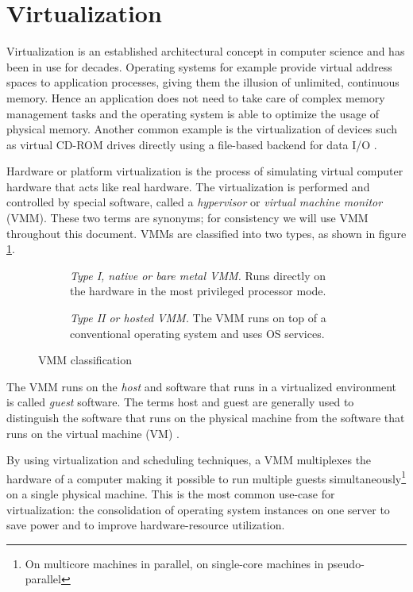 \section{Virtualization}
Virtualization is an established architectural concept in computer science and
has been in use for decades. Operating systems for example provide virtual
address spaces to application processes, giving them the illusion of unlimited,
continuous memory. Hence an application does not need to take care of complex
memory management tasks and the operating system is able to optimize the usage
of physical memory. Another common example is the virtualization of devices such
as virtual CD-ROM drives directly using a file-based backend for data I/O
\cite{CryptoCloud}.

Hardware or platform virtualization is the process of simulating virtual
computer hardware that acts like real hardware. The virtualization is performed
and controlled by special software, called a
\emph{hypervisor} or \emph{virtual machine monitor}
(VMM). These two terms are synonyms; for consistency we will use VMM
throughout this document. VMMs are classified into two types, as shown in figure
\ref{fig:vmm-classification}.

\begin{figure}
	\centering
	\begin{subfigure}[b]{0.24\textwidth}
		\centering
		
		\caption{\emph{Type I, native or bare metal VMM.} Runs directly on the
		hardware in the most privileged processor mode.}
	\end{subfigure}
	\qquad
	\begin{subfigure}[b]{0.24\textwidth}
		\centering
		
		\caption{\emph{Type II or hosted VMM.} The VMM runs on top of a
		conventional operating system and uses OS services.}
	\end{subfigure}
	\caption{VMM classification}
	\label{fig:vmm-classification}
\end{figure}

The VMM runs on the \emph{host} and software that runs in a virtualized
environment is called \emph{guest} software. The terms host and guest are
generally used to distinguish the software that runs on the physical machine
from the software that runs on the virtual machine (VM)
\cite{wiki:virtualization}.

By using virtualization and scheduling techniques, a VMM multiplexes the
hardware of a computer making it possible to run multiple guests
simultaneously\footnote{On multicore machines in parallel, on single-core
machines in pseudo-parallel} on a single physical machine. This is the most
common use-case for virtualization: the consolidation of operating system
instances on one server to save power and to improve hardware-resource
utilization.


